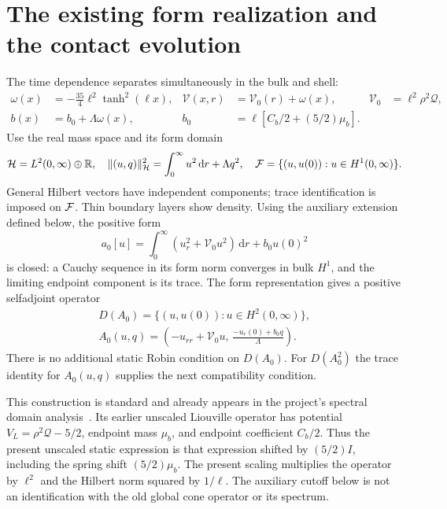 \documentclass[11pt]{article}
\newcommand{\dd}{\,\mathrm d}
\newcommand{\norm}[1]{\lVert #1\rVert}
\newcommand{\HH}{\mathcal H}
\begin{document}
\section{The existing form realization and the contact evolution}
\label{sec:operator}
The time dependence separates simultaneously in the bulk and shell:
\begin{equation}
\begin{aligned}
 \omega(x)&=-\frac{35}{4}\ell^2\tanh^2(\ell x),&
 \mathcal V(x,r)&=\mathcal V_0(r)+\omega(x),&
 \mathcal V_0&=\ell^2\rho^2\mathcal Q,\\
 b(x)&=b_0+\Lambda\omega(x),&
 b_0&=\ell[C_b/2+(5/2)\mu_b].
\end{aligned}
\label{eq:separation}
\end{equation}
Use the real mass space and its form domain
\begin{equation}
 \HH=L^2(0,\infty)\oplus\mathbb R,\quad
 \norm{(u,q)}_{\HH}^2=\int_0^\infty u^2\dd r+\Lambda q^2,\quad
 {\cal F}=\{(u,u(0)):u\in H^1(0,\infty)\}.
\end{equation}
General Hilbert vectors have independent components; trace identification
is imposed on $ {\cal F}$.
Thin boundary layers show density. Using the auxiliary extension defined
below, the positive form
\begin{equation}
 a_0[u]=\int_0^\infty(u_r^2+\mathcal V_0u^2)\dd r+b_0u(0)^2
 \label{eq:form}
\end{equation}
is closed: a Cauchy sequence in its form norm converges in bulk $H^1$,
and the limiting endpoint component is its trace.
The form representation gives a positive selfadjoint operator
\begin{equation}
\begin{gathered}
 D(A_0)=\{(u,u(0)):u\in H^2(0,\infty)\},\\
 A_0(u,q)=\left(-u_{rr}+\mathcal V_0u,\,
                   \frac{-u_r(0)+b_0q}{\Lambda}\right).
\end{gathered}
\label{eq:operator}
\end{equation}
There is no additional static Robin condition on $D(A_0)$.
For $D(A_0^2)$ the trace identity for $A_0(u,q)$ supplies the
next compatibility condition.

This construction is standard and already appears in the project's
spectral domain analysis~\cite{spectra}. Its earlier unscaled Liouville
operator has potential $V_L=\rho^2\mathcal Q-5/2$, endpoint mass $\mu_b$,
and endpoint coefficient $C_b/2$. Thus the present unscaled static
expression is that expression shifted by $(5/2)I$, including the spring
shift $(5/2)\mu_b$. The present scaling multiplies the operator by $\ell^2$
and the Hilbert norm squared by $1/\ell$.
The auxiliary cutoff below is not an identification with the old global
cone operator or its spectrum.
\end{document}
